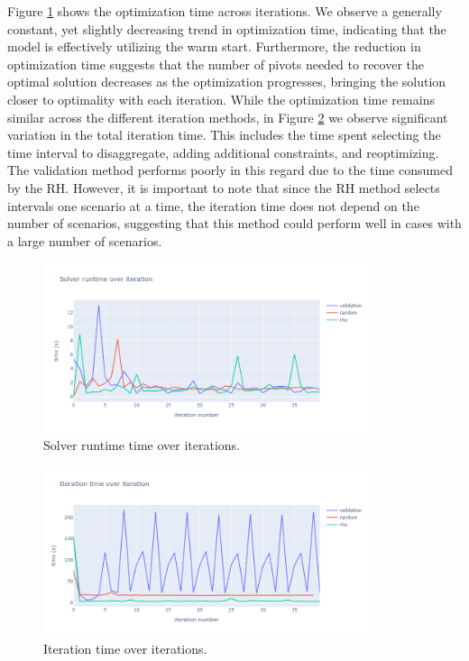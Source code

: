 \documentclass[smallextended,natbib]{svjour3}       %
\numberwithin{definition}{section}
\numberwithin{theorem}{section}
\numberwithin{proposition}{section}
\begin{document}
Figure \ref{fig:opt_time_over_iter} shows the optimization time across iterations.
 We observe a generally constant, yet slightly decreasing trend in optimization time, indicating that the model is effectively utilizing the warm start. Furthermore, the reduction in optimization time suggests that the number of pivots needed to recover the optimal solution decreases as the optimization progresses, bringing the solution closer to optimality with each iteration.
 While the optimization time remains similar across the different iteration methods, in Figure \ref{fig:iter_time_over_iter} we observe significant variation in the total iteration time. This includes the time spent selecting the time interval to disaggregate, adding additional constraints, and reoptimizing. 
 The validation method performs poorly in this regard due to the time consumed by the RH. However, it is important to note that since the RH method selects intervals one scenario at a time, the iteration time does not depend on the number of scenarios, suggesting that this method could perform well in cases with a large number of scenarios.
 

\begin{figure}[H]
  \centering
  \includegraphics[width=0.85\textwidth]{images/opt_time_over_iter.png}%
  \caption{Solver runtime time over iterations.}
  \label{fig:opt_time_over_iter}
\end{figure}

\begin{figure}[H]
  \centering
  \includegraphics[width=0.85\textwidth]{images/iter_time_over_iter.png}%
  \caption{Iteration time over iterations.}
  \label{fig:iter_time_over_iter}
\end{figure}
\end{document}
